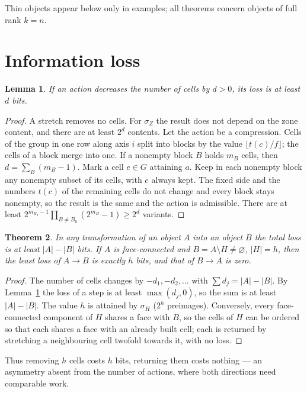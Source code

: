\documentclass[11pt,a4paper]{article}
\theoremstyle{plain}
\newtheorem{theorem}{Theorem}
\newtheorem{lemma}[theorem]{Lemma}
\theoremstyle{definition}
\theoremstyle{remark}
\begin{document}
Thin objects appear below only in examples; all theorems concern objects of full rank $k=n$.

\section{Information loss}\label{sec:loss}

\begin{lemma}\label{lem:bit}
If an action decreases the number of cells by $d>0$, its loss is at least $d$ bits.
\end{lemma}
\begin{proof}
A stretch removes no cells. For $\sigma_Z$ the result does not depend on the zone content, and there are at least $2^d$ contents. Let the action be a compression. Cells of the group in one row along axis $i$ split into blocks by the value $\lfloor t(c)/f\rfloor$; the cells of a block merge into one. If a nonempty block $B$ holds $m_B$ cells, then $d=\sum_B(m_B-1)$. Mark a cell $e\in G$ attaining $a$. Keep in each nonempty block any nonempty subset of its cells, with $e$ always kept. The fixed side and the numbers $t(c)$ of the remaining cells do not change and every block stays nonempty, so the result is the same and the action is admissible. There are at least $2^{m_{B_0}-1}\prod_{B\ne B_0}(2^{m_B}-1)\ge 2^{d}$ variants.
\end{proof}

\begin{theorem}\label{thm:loss}
In any transformation of an object $A$ into an object $B$ the total loss is at least $|A|-|B|$ bits. If $A$ is face-connected and $B=A\setminus H\neq\varnothing$, $|H|=h$, then the least loss of $A\to B$ is exactly $h$ bits, and that of $B\to A$ is zero.
\end{theorem}
\begin{proof}
The number of cells changes by $-d_1,-d_2,\dots$ with $\sum d_j=|A|-|B|$. By Lemma~\ref{lem:bit} the loss of a step is at least $\max(d_j,0)$, so the sum is at least $|A|-|B|$. The value $h$ is attained by $\sigma_H$ ($2^h$ preimages). Conversely, every face-connected component of $H$ shares a face with $B$, so the cells of $H$ can be ordered so that each shares a face with an already built cell; each is returned by stretching a neighbouring cell twofold towards it, with no loss.
\end{proof}

Thus removing $h$ cells costs $h$ bits, returning them costs nothing — an asymmetry absent from the number of actions, where both directions need comparable work.
\end{document}
